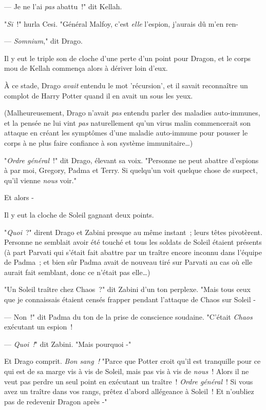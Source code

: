 --- Je ne l'ai \emph{pas} abattu~!" dit Kellah.

"\emph{Si}~!" hurla Cesi. "Général Malfoy, c'est \emph{elle} l'espion, j'aurais dû m'en ren-

--- \emph{Somnium}," dit Drago.

Il y eut le triple son de cloche d'une perte d'un point pour Dragon, et le corps mou de Kellah commença alors à dériver loin d'eux.

À ce stade, Drago \emph{avait} entendu le mot 'récursion', et il savait reconnaître un complot de Harry Potter quand il en avait un sous les yeux.

(Malheureusement, Drago n'avait \emph{pas} entendu parler des maladies auto-immunes, et la pensée ne lui vint \emph{pas} naturellement qu'un virus malin commencerait son attaque en créant les symptômes d'une maladie auto-immune pour pousser le corps à ne plus faire confiance à son système immunitaire…)

"\emph{Ordre général}~!" dit Drago, élevant sa voix. "Personne ne peut abattre d'espions à par moi, Gregory, Padma et Terry. Si quelqu'un voit quelque chose de suspect, qu'il vienne \emph{nous} voir."

Et alors -

Il y eut la cloche de Soleil gagnant deux points.

"\emph{Quoi}~?" dirent Drago et Zabini presque au même instant~; leurs têtes pivotèrent. Personne ne semblait avoir été touché et tous les soldats de Soleil étaient présents (à part Parvati qui s'était fait abattre par un traître encore inconnu dans l'équipe de Padma~; et bien sûr Padma avait de nouveau tiré sur Parvati au cas où elle aurait fait semblant, donc ce n'était pas elle…)

"Un Soleil traître chez Chaos~?" dit Zabini d'un ton perplexe. "Mais tous ceux que je connaissais étaient censés frapper pendant l'attaque de Chaos sur Soleil -

--- Non~!" dit Padma du ton de la prise de conscience soudaine. "C'était \emph{Chaos} exécutant un espion~!

--- \emph{Quoi~!}" dit Zabini. "Mais pourquoi -"

Et Drago comprit. \emph{Bon sang~!} "Parce que Potter croit qu'il est tranquille pour ce qui est de sa marge vis à vis de Soleil, mais pas vis à vis de \emph{nous}~! Alors il ne veut pas perdre un seul point en exécutant un traître~! \emph{Ordre général}~! Si vous avez un traître dans vos rangs, prêtez d'abord allégeance à Soleil~! Et n'oubliez pas de redevenir Dragon après -"

